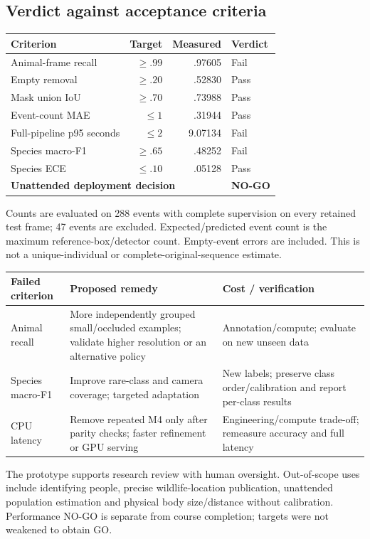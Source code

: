 \documentclass[11pt,a4paper]{article}
\begin{document}
\subsection{Verdict against acceptance criteria}
\begin{center}\small\begin{tabular}{lrrl}\toprule
Criterion & Target & Measured & Verdict\\\midrule
Animal-frame recall & $\geq .99$ & .97605 & Fail\\
Empty removal & $\geq .20$ & .52830 & Pass\\
Mask union IoU & $\geq .70$ & .73988 & Pass\\
Event-count MAE & $\leq 1$ & .31944 & Pass\\
Full-pipeline p95 seconds & $\leq 2$ & 9.07134 & Fail\\
Species macro-F1 & $\geq .65$ & .48252 & Fail\\
Species ECE & $\leq .10$ & .05128 & Pass\\\midrule
\multicolumn{3}{l}{\textbf{Unattended deployment decision}} & \textbf{NO-GO}\\\bottomrule
\end{tabular}\end{center}
Counts are evaluated on 288 events with complete supervision on every retained test frame; 47 events are excluded. Expected/predicted event count is the maximum reference-box/detector count. Empty-event errors are included. This is not a unique-individual or complete-original-sequence estimate.
\par\noindent\begin{tabularx}{\linewidth}{@{}l Y Y@{}}\toprule
Failed criterion & Proposed remedy & Cost / verification\\\midrule
Animal recall & More independently grouped small/occluded examples; validate higher resolution or an alternative policy & Annotation/compute; evaluate on new unseen data\\
Species macro-F1 & Improve rare-class and camera coverage; targeted adaptation & New labels; preserve class order/calibration and report per-class results\\
CPU latency & Remove repeated M4 only after parity checks; faster refinement or GPU serving & Engineering/compute trade-off; remeasure accuracy and full latency\\\bottomrule
\end{tabularx}\par
The prototype supports research review with human oversight. Out-of-scope uses include identifying people, precise wildlife-location publication, unattended population estimation and physical body size/distance without calibration. Performance NO-GO is separate from course completion; targets were not weakened to obtain GO.
\end{document}
